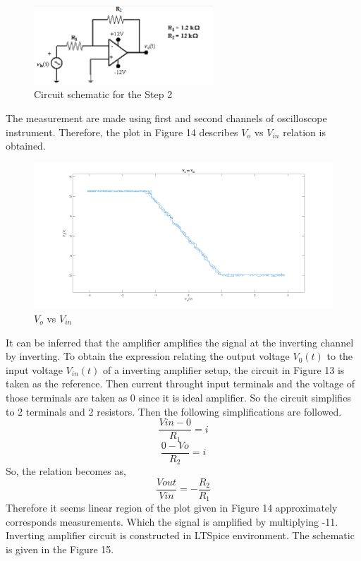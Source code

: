 \documentclass[letterpaper,12pt]{article}
\begin{document}
\begin{figure}[H]
	\centering
   \includegraphics[width=0.6\textwidth]{circuit3.png}
   \caption{Circuit schematic for the Step 2}
\end{figure} 
The measurement are made using first and second channels of oscilloscope instrument. Therefore, the plot in Figure 14 describes \(V_{o} \) vs \( V_{in}\) relation is obtained.
\begin{figure}[H]
	\centering
   \includegraphics[width=1\textwidth]{e_2.png}
   \caption{\(V_{o} \) vs \( V_{in}\)}
\end{figure} 
It can be inferred that the amplifier amplifies the signal at the inverting channel by inverting. To obtain the expression relating the output voltage \(V_0 (t)\) to the input voltage \(V_{in} (t)\) of a inverting amplifier setup, the circuit in Figure 13 is taken as the reference. Then current throught input terminals and the voltage of those terminals are taken as 0 since it is ideal amplifier. So the circuit simplifies to 2 terminals and 2 resistors. Then the following simplifications are followed.
\[\frac{V{in} - 0 }{R_1} = i\]
\[\frac{0 - V{o} }{R_2} = i\]
So, the relation becomes as,
\[\frac{V{out}}{V{in}} = -\frac{R_2}{R_1}\]
Therefore it seems linear region of the plot given in Figure 14 approximately corresponds measurements. Which the signal is amplified by multiplying -11.
Inverting amplifier circuit is constructed in LTSpice environment. The schematic is given in the Figure 15.
\end{document}
